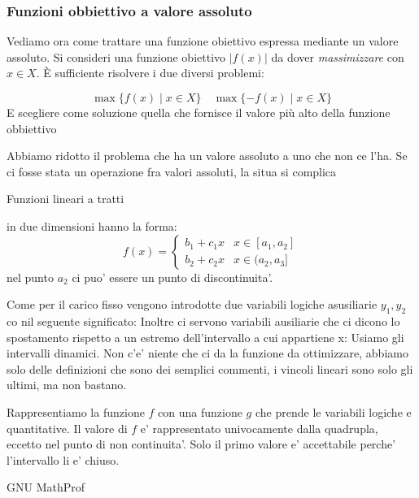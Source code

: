 \subsubsection{Funzioni obbiettivo a valore assoluto}
Vediamo ora come trattare una funzione obiettivo espressa mediante un valore assoluto. Si consideri una funzione obiettivo $|f(x)|$ da dover \textit{massimizzare} con $x\in X$. È sufficiente risolvere i due diversi problemi:

\[
  \max \{f(x)\mid x \in X\} \quad \max \{-f(x)\mid x \in X\}
\]
E scegliere come soluzione quella che fornisce il valore più alto della funzione obbiettivo

Abbiamo ridotto il problema che ha un valore assoluto a uno che non ce l'ha. Se ci fosse stata un operazione fra valori assoluti, la situa si complica

Funzioni lineari a tratti

in due dimensioni hanno la forma:
\[
  f(x) = \begin{cases}
    b_1 + c_1x & x \in [a_1, a_2]\\
    b_2+c_2x & x \in (a_2, a_3]
  \end{cases}
\]
nel punto $ a_2 $ ci puo' essere un punto di discontinuita'.

Come per il carico fisso vengono introdotte due variabili logiche asusiliarie $ y_1, y_2 $ co nil seguente significato:
Inoltre ci servono variabili ausiliarie che ci dicono lo spostamento rispetto a un estremo dell'intervallo a cui appartiene x:
Usiamo gli intervalli dinamici.
Non c'e' niente che ci da la funzione da ottimizzare, abbiamo solo delle definizioni che sono dei semplici commenti, i vincoli lineari sono solo gli ultimi, ma non bastano. 

Rappresentiamo la funzione $ f $ con una funzione $ g $ che prende le variabili logiche e quantitative. 
Il valore di $ f $ e' rappresentato univocamente dalla quadrupla, eccetto nel punto di non continuita'. Solo il primo valore e' accettabile perche' l'intervallo li e' chiuso. 

GNU MathProf
